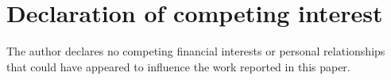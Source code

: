 \documentclass[review,12pt]{elsarticle}
\begin{document}
\section*{Declaration of competing interest}
The author declares no competing financial interests or personal relationships that could have appeared to influence the work reported in this paper.

\appendix
\label{app:disp_ref}
\label{app:numbers_ref}
\label{app:repro_ref}
\label{app:catalogue_ref}
\label{app:glossary_ref}
\label{app:debye_ref}
\label{app:params_ref}



\end{document}
